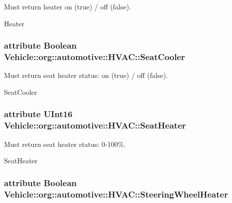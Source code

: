 Must return heater on (true) / off (false). 

Heater \hypertarget{interfaceVehicle_1_1org_1_1automotive_1_1HVAC_a08e7409d8a8430411765525ec0e1b446}{
\subsubsection[{Seat\-Cooler}]{\setlength{\rightskip}{0pt plus 5cm}attribute Boolean Vehicle\-::org\-::automotive\-::\-H\-V\-A\-C\-::\-Seat\-Cooler}}\label{interfaceVehicle_1_1org_1_1automotive_1_1HVAC_a08e7409d8a8430411765525ec0e1b446}


Must return seat heater status\-: on (true) / off (false). 

Seat\-Cooler \hypertarget{interfaceVehicle_1_1org_1_1automotive_1_1HVAC_a35b84693d02a453f5e6c42bb0be1403d}{
\subsubsection[{Seat\-Heater}]{\setlength{\rightskip}{0pt plus 5cm}attribute U\-Int16 Vehicle\-::org\-::automotive\-::\-H\-V\-A\-C\-::\-Seat\-Heater}}\label{interfaceVehicle_1_1org_1_1automotive_1_1HVAC_a35b84693d02a453f5e6c42bb0be1403d}


Must return seat heater status\-: 0-\/100\%. 

Seat\-Heater \hypertarget{interfaceVehicle_1_1org_1_1automotive_1_1HVAC_a4e157aec7fda03698fc84ed8b84f1f67}{
\subsubsection[{Steering\-Wheel\-Heater}]{\setlength{\rightskip}{0pt plus 5cm}attribute Boolean Vehicle\-::org\-::automotive\-::\-H\-V\-A\-C\-::\-Steering\-Wheel\-Heater}}\label{interfaceVehicle_1_1org_1_1automotive_1_1HVAC_a4e157aec7fda03698fc84ed8b84f1f67}


